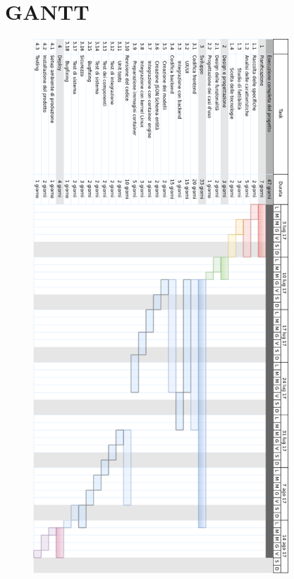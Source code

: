 \documentclass[../main.tex]{subfiles}
\begin{document}
\section{GANTT}
\begin{figure}[H]
    \center
    \includegraphics[height=20cm]{capitoli/gantt.png}
\end{figure}
\clearpage
\end{document}
